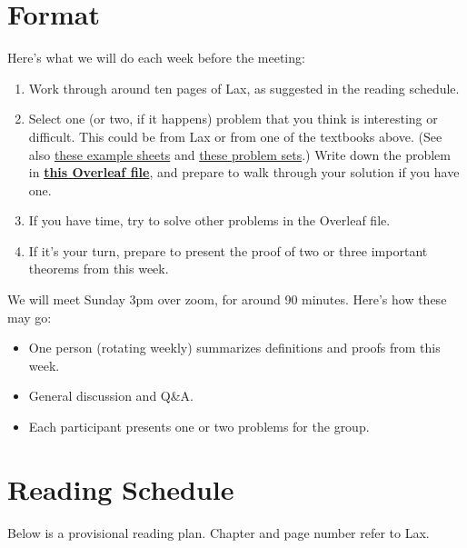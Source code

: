 \documentclass{article}
\begin{document}
\section{Format}
Here's what we will do each week before the meeting:
\begin{enumerate}
    \item Work through around ten pages of Lax, as suggested in the reading schedule.
    \item Select one (or two, if it happens) problem that you think is interesting or difficult. This could be from Lax or from one of the textbooks above. (See also \href{https://www.dpmms.cam.ac.uk/study/IB/LinearAlgebra/}{these example sheets} and \href{https://ocw.mit.edu/courses/18-700-linear-algebra-fall-2013/pages/assignments/}{these problem sets}.) Write down the problem in \href{https://www.overleaf.com/8251467867kkqxyvzcmndp#f019d2}{\textbf{this Overleaf file}}, and prepare to walk through your solution if you have one.
    \item If you have time, try to solve other problems in the Overleaf file.
    \item If it's your turn, prepare to present the proof of two or three important theorems from this week.
\end{enumerate}

We will meet Sunday 3pm over zoom, for around 90 minutes. Here's how these may go:
\begin{itemize}
    \item One person (rotating weekly) summarizes definitions and proofs from this week.
    \item General discussion and Q\&A.
    \item Each participant presents one or two problems for the group.
\end{itemize}

\section{Reading Schedule}
Below is a provisional reading plan. Chapter and page number refer to Lax.
\end{document}
